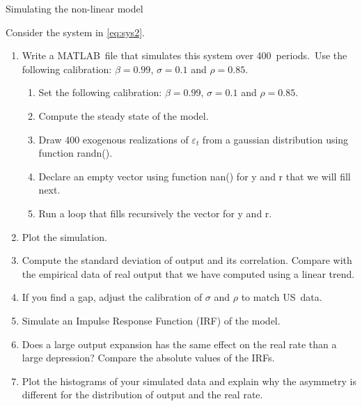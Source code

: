 \documentclass[a4paper,12pt]{article}%
\begin{document}
\begin{myexercise}{Simulating the non-linear model}
%


Consider the system in \autoref{eq:sys2}.

\begin{enumerate}
\item Write a MATLAB\ file that simulates this system over 400\ periods.\ Use
the following calibration: $\beta=0.99$, $\sigma=0.1$ and $\rho=0.85.$\ 

\begin{enumerate}
\item Set the following calibration: $\beta=0.99$, $\sigma=0.1$ and
$\rho=0.85.$\ 

\item Compute the steady state of the model.

\item Draw 400 exogenous realizations of $\varepsilon_{t}$ from a gaussian
distribution using function \textsf{randn()}.

\item Declare an empty vector using function \textsf{nan()} for \textsf{y} and
\textsf{r} that we will fill next.

\item Run a loop that fills recursively the vector for \textsf{y} and
\textsf{r}.
\end{enumerate}

\item Plot the simulation.

\item Compute the standard deviation of output and its correlation. Compare
with the empirical data of real output that we have computed using a linear trend.

\item If you find a gap, adjust the calibration of $\sigma$ and $\rho$ to
match US\ data.

\item Simulate an Impulse Response Function (IRF) of the model.

\item Does a large output expansion has the same effect on the real rate than
a large depression? Compare the absolute values of the IRFs.

\item Plot the histograms of your simulated data and explain why the asymmetry
is different for the distribution of output and the real rate.
\end{enumerate}

%

\end{myexercise}%
\end{document}
